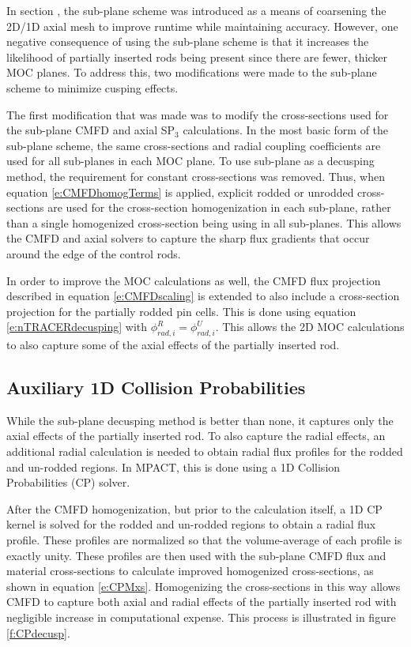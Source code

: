 In section , the sub-plane scheme was introduced as a means of coarsening the 2D/1D axial mesh to improve runtime while maintaining accuracy.  However, one negative consequence of using the sub-plane scheme is that it increases the likelihood of partially inserted rods being present since there are fewer, thicker MOC planes.  To address this, two modifications were made to the sub-plane scheme to minimize cusping effects.

The first modification that was made was to modify the cross-sections used for the sub-plane CMFD and axial SP$_3$ calculations.  In the most basic form of the sub-plane scheme, the same cross-sections and radial coupling coefficients are used for all sub-planes in each MOC plane.  To use sub-plane as a decusping method, the requirement for constant cross-sections was removed.  Thus, when equation \ref{e:CMFDhomogTerms} is applied, explicit rodded or unrodded cross-sections are used for the cross-section homogenization in each sub-plane, rather than a single homogenized cross-section being using in all sub-planes.  This allows the CMFD and axial solvers to capture the sharp flux gradients that occur around the edge of the control rods.

In order to improve the MOC calculations as well, the CMFD flux projection described in equation \ref{e:CMFDscaling} is extended to also include a cross-section projection for the partially rodded pin cells.  This is done using equation \ref{e:nTRACERdecusping} with $\phi_{rad,i}^R = \phi_{rad,i}^U$.  This allows the 2D MOC calculations to also capture some of the axial effects of the partially inserted rod.

\subsection{Auxiliary 1D Collision Probabilities}

While the sub-plane decusping method is better than none, it captures only the axial effects of the partially inserted rod.  To also capture the radial effects, an additional radial calculation is needed to obtain radial flux profiles for the rodded and un-rodded regions.  In MPACT, this is done using a 1D Collision Probabilities (CP) solver.

After the CMFD homogenization, but prior to the calculation itself, a 1D CP kernel is solved for the rodded and un-rodded regions to obtain a radial flux profile.  These profiles are normalized so that the volume-average of each profile is exactly unity.  These profiles are then used with the sub-plane CMFD flux and material cross-sections to calculate improved homogenized cross-sections, as shown in equation \ref{e:CPMxs}.  Homogenizing the cross-sections in this way allows CMFD to capture both axial and radial effects of the partially inserted rod with negligible increase in computational expense.  This process is illustrated in figure \ref{f:CPdecusp}.

